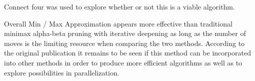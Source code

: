 \documentclass[10pt, a4paper]{article}
\begin{document}
Connect four was used to explore whether or not this is a viable algorithm.

Overall Min / Max Approximation appears more effective than traditional 
minimax alpha-beta pruning with iterative deepening as long as the number of moves 
is the limiting resource when comparing the two methods.  According to the original 
publication it remains to be seen if this method can be incorporated into other 
methods in order to produce more efficient algorithms as well as to explore possibilities in
parallelization.
\end{document}
